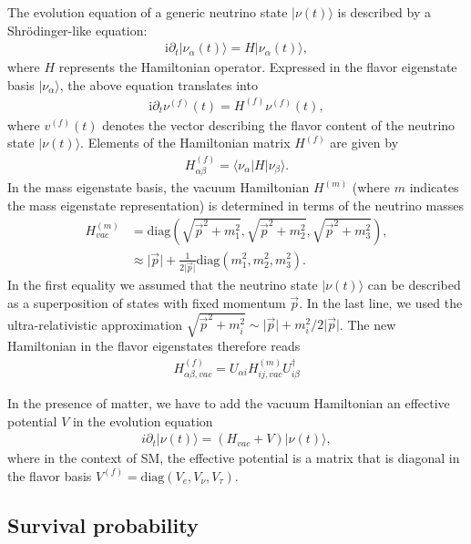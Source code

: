 \documentclass[twocolumn,secnumarabic,amssymb, nobibnotes, aps, prd,10pt]{revtex4-1}
\newcommand{\kt}[1]{\vert #1 \rangle}
\newcommand{\bkt}[3]{\langle #1 \vert #2 \vert #3 \rangle}
\begin{document}
The evolution equation of a generic neutrino state $\kt{\nu(t)}$ is described by a
Shrödinger-like equation:
\begin{align}
\mathrm{i} \partial_t \kt{\nu_\alpha(t)} = H \kt{\nu_\alpha(t)},
\end{align}
where $H$ represents the Hamiltonian operator. Expressed in the flavor eigenstate
basis $\kt{\nu_\alpha}$, the above equation translates into
\begin{align}
\mathrm{i} \partial_t \nu^{(f)}(t) = H^{(f)} \nu^{(f)}(t),
\end{align}
where $v^{(f)}(t)$ denotes the vector describing the flavor content of the neutrino state
$\kt{\nu(t)}$. Elements of the Hamiltonian matrix $H^{(f)}$ are given by
\begin{align}
H^{(f)}_{\alpha \beta} = \bkt{\nu_\alpha}{H}{\nu_\beta}.
\end{align}
In the mass eigenstate basis, the vacuum Hamiltonian $H^{(m)}$ (where $m$ indicates the
mass eigenstate representation) is determined in terms of the neutrino masses
\begin{align}
H^{(m)}_{vac} &= \mathrm{diag} \left( \sqrt{\vec{p}^2 + m_1^2}, \sqrt{\vec{p}^2 + m_2^2},
\sqrt{\vec{p}^2 + m_3^2} \right), \nonumber \\
&\approx \vert \vec{p} \vert + \frac{1}{2 \vert \vec{p} \vert} \mathrm{diag} \left( m_1^2, 
m_2^2, m_3^2 \right).
\end{align}
In the first equality we assumed that the neutrino state $\kt{\nu (t)}$ can be described
as a superposition of states with fixed momentum $\vec{p}$. In the last line, we used the
ultra-relativistic approximation $\sqrt{\vec{p}^2 + m_i^2} \sim \vert \vec{p} \vert + m_i^2
/2 \vert \vec{p} \vert$. The new Hamiltonian in the flavor eigenstates therefore reads
\begin{align}
H^{(f)}_{\alpha \beta, vac} = U_{\alpha i} H^{(m)}_{ij, vac} U^\dagger_{i \beta}
\end{align}

In the presence of matter, we have to add the vacuum Hamiltonian an effective potential
$V$ in the evolution equation
\begin{align}
i \partial_t \kt{\nu (t)} = \left( H_{vac} + V \right) \kt{\nu (t)},
\end{align}
where in the context of SM, the effective potential is a matrix that is diagonal in the
flavor basis $V^{(f)} = \mathrm{diag} \left( V_e, V_\nu, V_\tau \right)$.


\subsection{Survival probability}
\label{subsec:survival}
\end{document}
